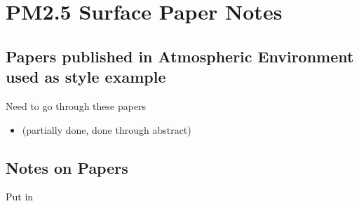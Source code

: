 \section{PM2.5 Surface Paper Notes}

\subsection{Papers published in Atmospheric Environment used as style example}

Need to go through these papers
\begin{itemize}
\item \cite{BrokampExposure2017} (partially done, done through abstract)
\end{itemize}



\subsection{Notes on Papers}

Put in \cite{BrokampExposure2017,larsen_impacts_2017}
